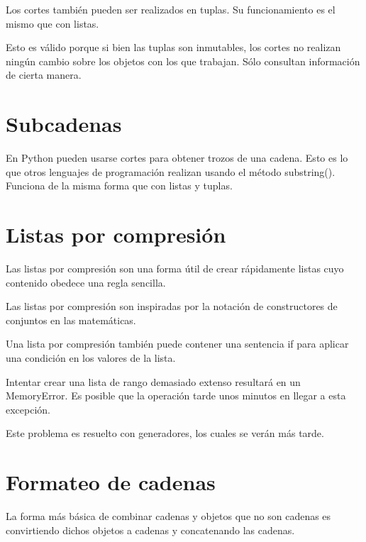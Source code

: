 \documentclass{report}
\begin{document}
Los cortes también pueden ser realizados en tuplas. Su funcionamiento es el mismo que con listas.


Esto es válido porque si bien las tuplas son inmutables, los cortes no realizan ningún cambio sobre los objetos con los que trabajan. Sólo consultan información de cierta manera.

\section{Subcadenas}

En Python pueden usarse cortes para obtener trozos de una cadena. Esto es lo que otros lenguajes de programación realizan usando el método substring(). Funciona de la misma forma que con listas y tuplas.


\section{Listas por compresión}

Las listas por compresión son una forma útil de crear rápidamente listas cuyo contenido obedece una regla sencilla.


Las listas por compresión son inspiradas por la notación de constructores de conjuntos en las matemáticas.\smallskip

Una lista por compresión también puede contener una sentencia if para aplicar una condición en los valores de la lista.


Intentar crear una lista de rango demasiado extenso resultará en un MemoryError. Es posible que la operación tarde unos minutos en llegar a esta excepción.


Este problema es resuelto con generadores, los cuales se verán más tarde.

\section{Formateo de cadenas}

La forma más básica de combinar cadenas y objetos que no son cadenas es convirtiendo dichos objetos a cadenas y concatenando las cadenas.\smallskip
\end{document}
